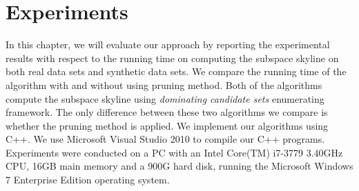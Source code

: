 
%
%

\chapter{Experiments}
\label{ch:exp}

In this chapter, we will evaluate our approach by reporting the experimental results with respect to the running time on computing the subspace skyline on both real data sets and synthetic data sets. We compare the running time of the algorithm with and without using pruning method. Both of the algorithms compute the subspace skyline using \emph{dominating candidate sets} enumerating framework. The only difference between these two algorithms we compare is whether the pruning method is applied.
We implement our algorithms using C++. We use Microsoft Visual Studio 2010 to compile our C++ programs. Experiments were conducted on a PC with an Intel Core(TM) i7-3779 3.40GHz CPU, 16GB main memory and a 900G hard disk, running the Microsoft Windows 7 Enterprise Edition operating system.

